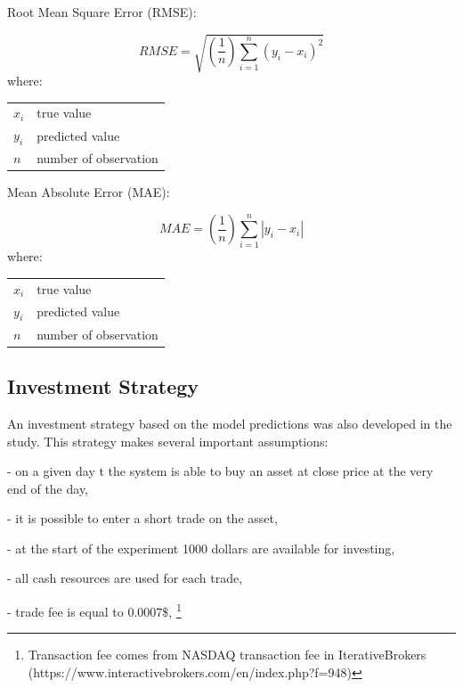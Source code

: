 \documentclass[11pt]{article} %
\makeatletter
\newenvironment{conditions}
  {\par\vspace{\abovedisplayskip}\noindent\begin{tabular}{>{$}l<{$} @{${}={}$} l}}
  {\end{tabular}\par\vspace{\belowdisplayskip}}
\makeatother
\begin{document}
\begin{center}   Root Mean Square Error (RMSE):  \end{center}
\begin{equation}  RMSE = \sqrt{(\frac{1}{n})\sum_{i=1}^{n}(y_{i} - x_{i})^{2}} \end{equation}
where:
\begin{conditions}
 x_i     &  true value \\
 y_i     &  predicted value \\   
 n &  number of observation
\end{conditions}

\begin{center}  Mean Absolute Error (MAE): \end{center}
\begin{equation} MAE =(\frac{1}{n})\sum_{i=1}^{n}\left | y_{i} - x_{i} \right | \end{equation}
where:
\begin{conditions}
 x_i     &  true value \\
 y_i     &  predicted value \\   
 n &  number of observation
\end{conditions}

\subsection{Investment Strategy}

An investment strategy based on the model predictions was also developed in the study. This strategy makes several important assumptions: 
 \begin{flushleft}- on a given day t the system is able to buy an asset at close price at the very end of the day, \end{flushleft}
 \begin{flushleft}- it is possible to enter a short trade on the asset, \end{flushleft}
 \begin{flushleft}- at the start of the experiment 1000 dollars are available for investing,  \end{flushleft}
\begin{flushleft}- all cash resources are used for each trade, \end{flushleft}
\begin{flushleft}- trade fee is equal to 0.0007\$, \footnote{Transaction fee comes from NASDAQ transaction fee in IterativeBrokers (https://www.interactivebrokers.com/en/index.php?f=948)} \end{flushleft}
\end{document}
